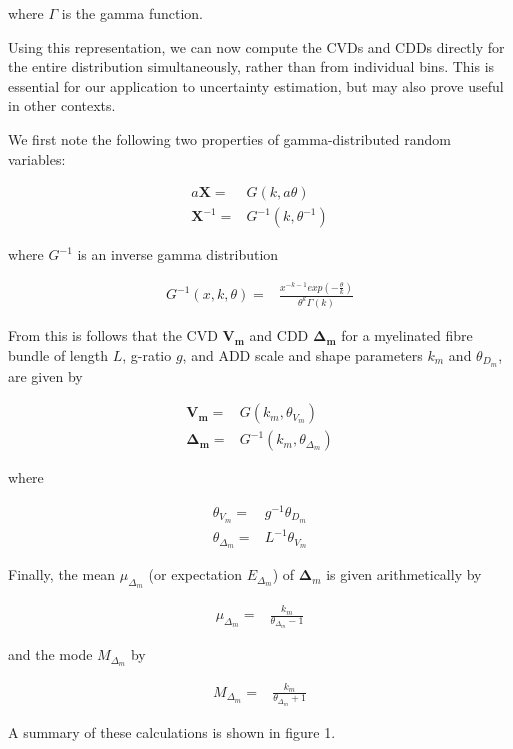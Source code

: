 where $\Gamma$ is the gamma function. 

Using this representation, we can now compute the CVDs and CDDs directly for the entire distribution simultaneously, rather than from individual bins. This is essential for our application to uncertainty estimation, but may also prove useful in other contexts.


We first note the following two properties of gamma-distributed random variables: 

\begin{eqnarray}
a \mathbf{X} =& G(k,a \theta ) \\
\mathbf{X}^{-1} =& G^{-1}(k,\theta^{-1} )
\end{eqnarray}

where $G^{-1}$ is an inverse gamma distribution

\begin{eqnarray}
G^{-1}(x,k,\theta) =& \frac{\displaystyle x^{-k-1} exp(- \frac{\displaystyle \theta}{ \displaystyle k})}{\displaystyle \theta^{k} \Gamma(k)} 
\end{eqnarray}

From this is follows that the CVD $\mathbf{V_m}$ and CDD $\mathbf{\Delta_m}$ for a myelinated fibre bundle of length $L$, g-ratio $g$, and ADD scale and shape parameters $k_m$ and $\theta_{D_{m}}$, are given by 

\begin{eqnarray}
\mathbf{V_m} =& G(k_m, \theta_{V_{m}}) \\
\mathbf{\Delta_m} =& G^{-1}(k_m, \theta_{\Delta_{m}})
\end{eqnarray}

where 

\begin{eqnarray}
\theta_{V{_m}} =& g^{-1} \theta_{D_{m}}  \\
\theta_{\Delta{_m}} =& L^{-1} \theta_{V_{m}}
\end{eqnarray}

Finally, the mean $\mu_{\Delta_m}$ (or expectation $E_{\Delta_m}$) of $\mathbf{\Delta}_m$ is given arithmetically by 

\begin{eqnarray}
\mu_{\Delta_m} =& \frac{\displaystyle k_m}{\displaystyle \theta_{\Delta_m} -1} \end{eqnarray}

and the mode $M_{\Delta_m}$ by 

\begin{eqnarray}
M_{\Delta_m} =& \frac{\displaystyle k_m}{\displaystyle \theta_{\Delta_m} +1}
\end{eqnarray}

A summary of these calculations is shown in figure 1. 

